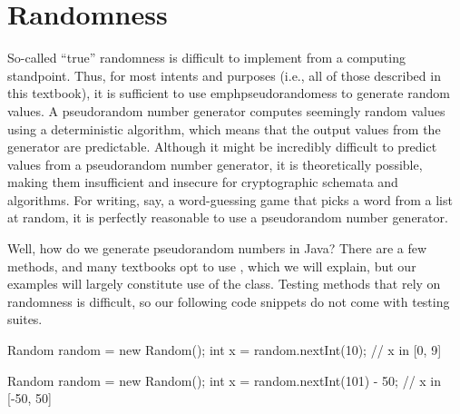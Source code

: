 \section{Randomness}
So-called ``true'' randomness is difficult to implement from a computing standpoint. Thus, for most intents and purposes (i.e., all of those described in this textbook), it is sufficient to use emph{pseudorandomess} to generate random values. A pseudorandom number generator computes seemingly random values using a deterministic algorithm, which means that the output values from the generator are predictable. Although it might be incredibly difficult to predict values from a pseudorandom number generator, it is theoretically possible, making them insufficient and insecure for cryptographic schemata and algorithms. For writing, say, a word-guessing game that picks a word from a list at random, it is perfectly reasonable to use a pseudorandom number generator.

Well, how do we generate pseudorandom numbers in Java? There are a few methods, and many textbooks opt to use , which we will explain, but our examples will largely constitute use of the  class. Testing methods that rely on randomness is difficult, so our following code snippets do not come with testing suites. 


\begin{verbnobox}[\small]
Random random = new Random();
int x = random.nextInt(10); // x in [0, 9]
\end{verbnobox}

\begin{verbnobox}[\small]
Random random = new Random();
int x = random.nextInt(101) - 50; // x in [-50, 50]
\end{verbnobox}

